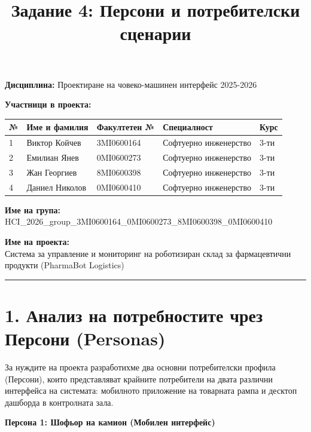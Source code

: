 \documentclass[12pt, a4paper]{article}
\title{Задание 4: Персони и потребителски сценарии}
\author{}
\date{}
\begin{document}
\maketitle

\noindent\textbf{Дисциплина:} Проектиране на човеко-машинен интерфейс 2025-2026

\bigskip

\noindent\textbf{Участници в проекта:}
\smallskip

\noindent
\begin{tabularx}{\textwidth}{|l|X|l|X|l|}
\hline
\textbf{№} & \textbf{Име и фамилия} & \textbf{Факултетен №} & \textbf{Специалност} & \textbf{Курс} \\ \hline
1 & Виктор Койчев & 3MI0600164 & Софтуерно инженерство & 3-ти \\ \hline
2 & Емилиан Янев & 0MI0600273 & Софтуерно инженерство & 3-ти \\ \hline
3 & Жан Георгиев & 8MI0600398 & Софтуерно инженерство & 3-ти \\ \hline
4 & Даниел Николов & 0MI0600410 & Софтуерно инженерство & 3-ти \\ \hline
\end{tabularx}

\bigskip

\noindent\textbf{Име на група:}\\
HCI\_2026\_group\_3MI0600164\_0MI0600273\_8MI0600398\_0MI0600410

\bigskip

\noindent\textbf{Име на проекта:}\\
Система за управление и мониторинг на роботизиран склад за фармацевтични продукти (PharmaBot Logistics)

\bigskip
\rule{\textwidth}{0.4pt}

\section*{1. Анализ на потребностите чрез Персони (Personas)}

За нуждите на проекта разработихме два основни потребителски профила (Персони), които представляват крайните потребители на двата различни интерфейса на системата: мобилното приложение на товарната рампа и десктоп дашборда в контролната зала.

\bigskip
\noindent\textbf{Персона 1: Шофьор на камион (Мобилен интерфейс)}
\end{document}
